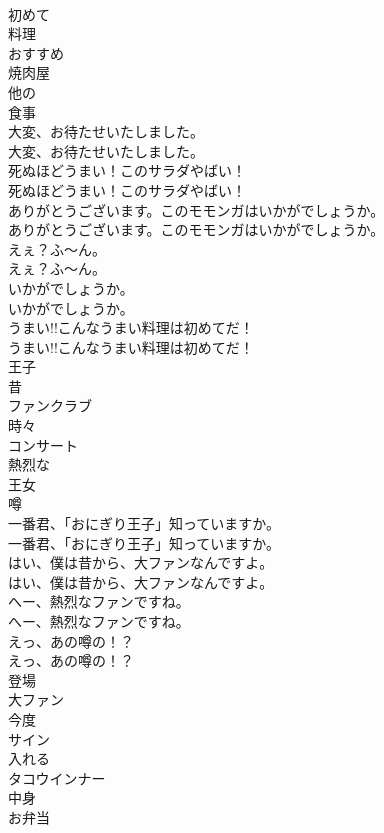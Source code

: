 \documentclass[8pt]{extreport}
\begin{document}
\begin{CJK}{UTF8}{min}
\\	初めて
\\	料理
\\	おすすめ
\\	焼肉屋
\\	他の
\\	食事
\\	大変、お待たせいたしました。	
\\	大変、お待たせいたしました。 
\\	死ぬほどうまい！このサラダやばい！	
\\	死ぬほどうまい！このサラダやばい！ 
\\	ありがとうございます。このモモンガはいかがでしょうか。	
\\	ありがとうございます。このモモンガはいかがでしょうか。 
\\	えぇ？ふ～ん。	
\\	えぇ？ふ～ん。 
\\	いかがでしょうか。	
\\	いかがでしょうか。 
\\	うまい!!こんなうまい料理は初めてだ！	
\\	うまい!!こんなうまい料理は初めてだ！ 
\\	王子
\\	昔
\\	ファンクラブ
\\	時々
\\	コンサート
\\	熱烈な
\\	王女
\\	噂
\\	一番君、「おにぎり王子」知っていますか。	
\\	一番君、「おにぎり王子」知っていますか。 
\\	はい、僕は昔から、大ファンなんですよ。	
\\	はい、僕は昔から、大ファンなんですよ。 
\\	へー、熱烈なファンですね。	
\\	へー、熱烈なファンですね。 
\\	えっ、あの噂の！？	
\\	えっ、あの噂の！？ 
\\	登場
\\	大ファン
\\	今度
\\	サイン
\\	入れる
\\	タコウインナー
\\	中身
\\	お弁当

\end{CJK}
\end{document}
